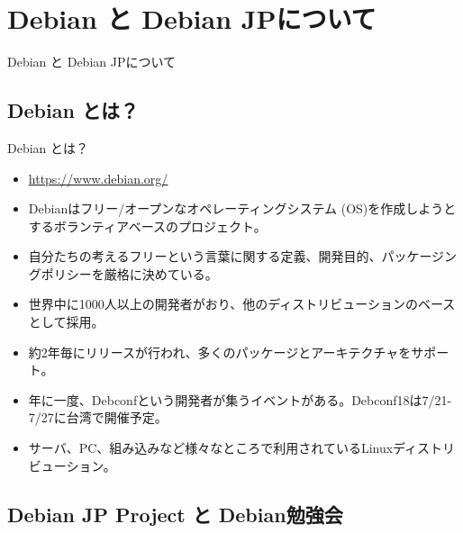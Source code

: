 
\section{Debian と Debian JPについて}

\begin{frame}
  \begin{center}\Huge{Debian と Debian JPについて}\end{center}
\end{frame}

\subsection{Debian とは？}

\begin{frame}{Debian とは？}
  
\begin{itemize}
\item \url{https://www.debian.org/}
\item Debianはフリー/オープンなオペレーティングシステム (OS)を作成しようとするボランティアベースのプロジェクト。
\item 自分たちの考えるフリーという言葉に関する定義、開発目的、パッケージングポリシーを厳格に決めている。
\item 世界中に1000人以上の開発者がおり、他のディストリビューションのベースとして採用。
\item 約2年毎にリリースが行われ、多くのパッケージとアーキテクチャをサポート。
\item 年に一度、Debconfという開発者が集うイベントがある。Debconf18は7/21-7/27に台湾で開催予定。
\item サーバ、PC、組み込みなど様々なところで利用されているLinuxディストリビューション。
\end{itemize}

\end{frame}


\subsection{Debian JP Project と Debian勉強会}

